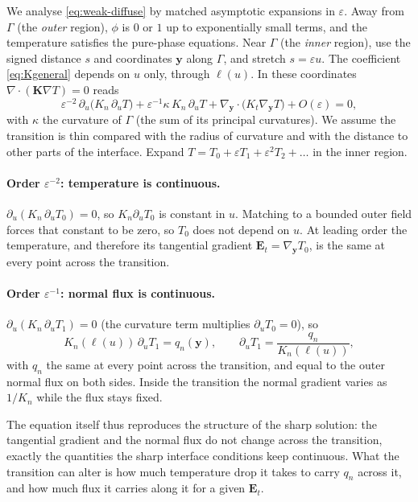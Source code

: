 \documentclass[11pt]{article}
\newcommand{\Gam}{\Gamma}
\newcommand{\bK}{\mathbf K}
\newcommand{\Kt}{K_{t}}
\newcommand{\Kn}{K_{n}}
\begin{document}
We analyse \eqref{eq:weak-diffuse} by matched asymptotic expansions in
$\varepsilon$. Away from $\Gam$ (the \emph{outer} region), $\phi$ is $0$ or
$1$ up to exponentially small terms, and the temperature satisfies the pure-phase
equations. Near $\Gam$ (the \emph{inner} region), use the signed distance $s$
and coordinates $\mathbf y$ along $\Gam$, and stretch $s=\varepsilon u$. The
coefficient \eqref{eq:Kgeneral} depends on $u$ only, through $\ell(u)$. In
these coordinates $\nabla\!\cdot(\bK\nabla T)=0$ reads
\begin{equation}
\varepsilon^{-2}\,\partial_u\!\big(\Kn\,\partial_uT\big)
+\varepsilon^{-1}\kappa\,\Kn\,\partial_uT
+\nabla_{\mathbf y}\!\cdot\!\big(\Kt\nabla_{\mathbf y}T\big)+O(\varepsilon)=0,
\label{eq:inner}
\end{equation}
with $\kappa$ the curvature of $\Gam$ (the sum of its principal curvatures). We assume the transition is thin
compared with the radius of curvature and with the distance to other parts of
the interface. Expand $T=T_0+\varepsilon T_1+\varepsilon^2T_2+\dots$ in the
inner region.

\paragraph{Order $\varepsilon^{-2}$: temperature is continuous.}
$\partial_u(\Kn\,\partial_uT_0)=0$, so $\Kn\partial_uT_0$ is constant in $u$.
Matching to a bounded outer field forces that constant to be zero, so $T_0$ does
not depend on $u$. At leading order the temperature, and therefore its
tangential gradient $\mathbf E_t=\nabla_{\mathbf y}T_0$, is the same at every
point across the transition.

\paragraph{Order $\varepsilon^{-1}$: normal flux is continuous.}
$\partial_u(\Kn\,\partial_uT_1)=0$ (the curvature term multiplies
$\partial_uT_0=0$), so
\begin{equation}
\Kn(\ell(u))\,\partial_uT_1=q_n(\mathbf y),\qquad
\partial_uT_1=\frac{q_n}{\Kn(\ell(u))},
\label{eq:qn}
\end{equation}
with $q_n$ the same at every point across the transition, and equal to the outer
normal flux on both sides. Inside the transition the normal gradient varies as
$1/\Kn$ while the flux stays fixed.

The equation itself thus reproduces the structure of the sharp solution: the
tangential gradient and the normal flux do not change across the transition,
exactly the quantities the sharp interface conditions keep continuous. What the
transition can alter is how much temperature drop it takes to carry $q_n$
across it, and how much flux it carries along it for a given $\mathbf E_t$.
\end{document}
